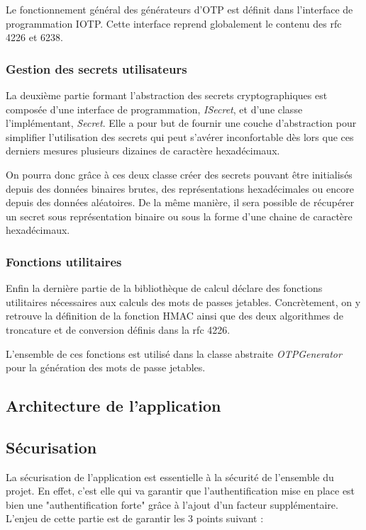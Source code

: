 Le fonctionnement général des générateurs d'OTP est définit dans l'interface de
programmation IOTP. Cette interface reprend globalement le contenu des rfc 4226 et 6238.

\subsubsection{Gestion des secrets utilisateurs}
La deuxième partie formant l'abstraction des secrets cryptographiques est composée d'une 
interface de programmation, \emph{ISecret}, et d'une classe l'implémentant, \emph{Secret}.
Elle a pour but de fournir une couche d'abstraction pour simplifier l'utilisation des secrets 
qui peut s'avérer inconfortable dès lors que ces derniers mesures plusieurs dizaines de 
caractère hexadécimaux.

On pourra donc grâce à ces deux classe créer des secrets pouvant être initialisés depuis des
données binaires brutes, des représentations hexadécimales ou encore depuis des données
aléatoires. De la même manière, il sera possible de récupérer un secret sous représentation
binaire ou sous la forme d'une chaine de caractère hexadécimaux.

\subsubsection{Fonctions utilitaires}
Enfin la dernière partie de la bibliothèque de calcul déclare des fonctions utilitaires 
nécessaires aux calculs des mots de passes jetables. Concrètement, on y retrouve la
définition de la fonction HMAC\cite{HMAC} ainsi que des deux algorithmes de troncature et 
de conversion définis dans la rfc 4226.

L'ensemble de ces fonctions est utilisé dans la classe abstraite \emph{OTPGenerator} pour la
génération des mots de passe jetables.

\subsection{Architecture de l'application}

\subsection{Sécurisation}
La sécurisation de l'application est essentielle à la sécurité de l'ensemble du projet. En
effet, c'est elle qui va garantir que l'authentification mise en place est bien une
"authentification forte" grâce à l'ajout d'un facteur supplémentaire. L'enjeu de cette 
partie est de garantir les 3 points suivant : 



